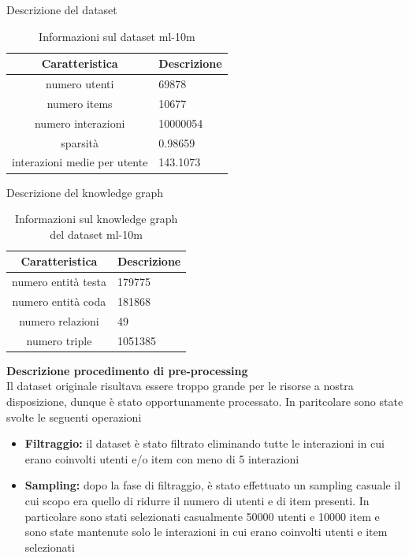 \noindent Descrizione del dataset
\begin{table}[H]
    \centering
    \footnotesize
    \begin{tabularx}{\textwidth}{|c|X|}
        \hline
        \textbf{Caratteristica} & \textbf{Descrizione} \\
        \hline
        numero utenti & 69878 \\
        \hline
        numero items & 10677 \\
        \hline
        numero interazioni & 10000054 \\
        \hline
        sparsità & 0.98659 \\
        \hline
        interazioni medie per utente & 143.1073 \\
        \hline
    \end{tabularx}
    \caption{Informazioni sul dataset ml-10m}
    \label{tab:dataset_info}
\end{table}


\noindent Descrizione del knowledge graph
\begin{table}[H]
    \centering
    \footnotesize
    \begin{tabularx}{\textwidth}{|c|X|}
        \hline
        \textbf{Caratteristica} & \textbf{Descrizione} \\
        \hline
        numero entità testa & 179775 \\
        \hline
        numero entità coda & 181868 \\
        \hline
        numero relazioni & 49 \\
        \hline
        numero triple & 1051385 \\
        \hline
    \end{tabularx}
    \caption{Informazioni sul knowledge graph del dataset ml-10m}
    \label{tab:dataset_info}
\end{table}




\noindent\textbf{Descrizione procedimento di pre-processing}\\


\noindent Il dataset originale risultava essere troppo grande per le risorse a nostra disposizione, dunque è stato opportunamente processato. In paritcolare sono state svolte le seguenti operazioni
\begin{itemize}
    \item \textbf{Filtraggio:} il dataset è stato filtrato eliminando tutte le interazioni in cui erano coinvolti utenti e/o item con meno di 5 interazioni
    \item \textbf{Sampling:} dopo la fase di filtraggio, è stato effettuato un sampling casuale il cui scopo era quello di ridurre il numero di utenti e di item presenti. In particolare sono stati selezionati casualmente 50000 utenti e 10000 item e sono state mantenute solo le interazioni in cui erano coinvolti utenti e item selezionati
\end{itemize}


